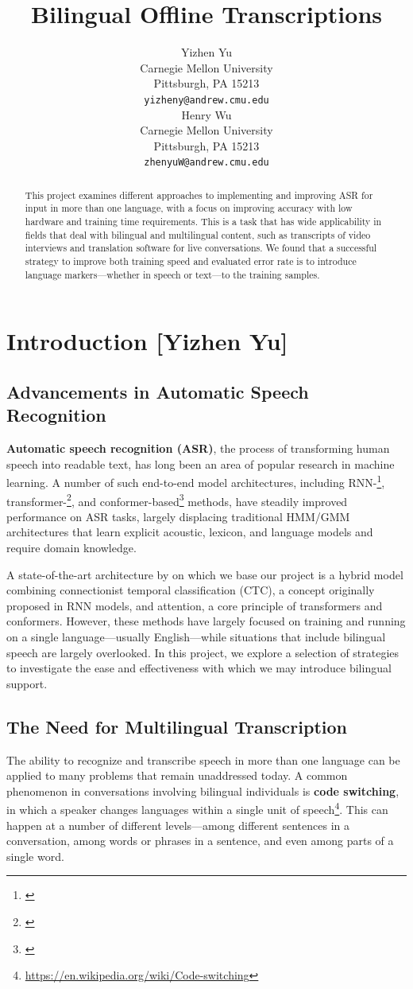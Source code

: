 \documentclass{article}
\title{Bilingual Offline Transcriptions}
\author{
  Yizhen Yu \\
  Carnegie Mellon University\\
  Pittsburgh, PA 15213 \\
  \texttt{yizheny@andrew.cmu.edu} \\\And
  Henry Wu \\
  Carnegie Mellon University \\
  Pittsburgh, PA 15213 \\
  \texttt{zhenyuW@andrew.cmu.edu}
}
\begin{document}
  \maketitle
  \begin{abstract}
    This project examines different approaches to implementing and improving ASR for input in more than one language, with a focus on improving accuracy with low hardware and training time requirements. This is a task that has wide applicability in fields that deal with bilingual and multilingual content, such as transcripts of video interviews and translation software for live conversations. We found that a successful strategy to improve both training speed and evaluated error rate is to introduce language markers---whether in speech or text---to the training samples.
  \end{abstract}
  \section{Introduction [Yizhen Yu]}
  \subsection{Advancements in Automatic Speech Recognition}
  \textbf{Automatic speech recognition (ASR)}, the process of transforming human speech into readable text, has long been an area of popular research in machine learning. A number of such end-to-end model architectures, including RNN-\footnote{\cite{Chan}}, transformer-\footnote{\cite{Vaswani}}, and conformer-based\footnote{\cite{Gulati}} methods, have steadily improved performance on ASR tasks, largely displacing traditional HMM/GMM architectures that learn explicit acoustic, lexicon, and language models and require domain knowledge.

  A state-of-the-art architecture by \cite{Kim} on which we base our project is a hybrid model combining connectionist temporal classification (CTC), a concept originally proposed in RNN models, and attention, a core principle of transformers and conformers. However, these methods have largely focused on training and running on a single language---usually English---while situations that include bilingual speech are largely overlooked. In this project, we explore a selection of strategies to investigate the ease and effectiveness with which we may introduce bilingual support.
  \subsection{The Need for Multilingual Transcription}
  The ability to recognize and transcribe speech in more than one language can be applied to many problems that remain unaddressed today. A common phenomenon in conversations involving bilingual individuals is \textbf{code switching}, in which a speaker changes languages within a single unit of speech\footnote{\url{https://en.wikipedia.org/wiki/Code-switching}}. This can happen at a number of different levels---among different sentences in a conversation, among words or phrases in a sentence, and even among parts of a single word.
\end{document}
